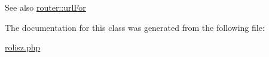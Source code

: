 \label{classrolisz_a2c24b81993e81c6401edd6c4caff0336}
\begin{DoxySeeAlso}{See also}
\hyperlink{classrouter_a2c24b81993e81c6401edd6c4caff0336}{router::urlFor} 
\end{DoxySeeAlso}


The documentation for this class was generated from the following file:\begin{DoxyCompactItemize}
\item 
\hyperlink{rolisz_8php}{rolisz.php}\end{DoxyCompactItemize}
